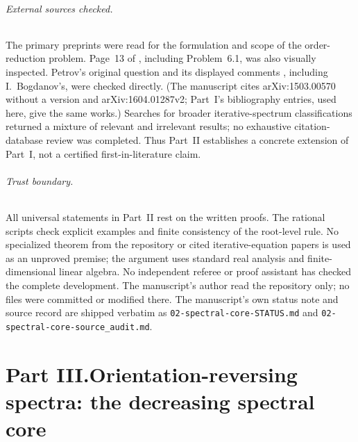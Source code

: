 \documentclass[11pt,letterpaper]{article}
\theoremstyle{definition}
\theoremstyle{remark}
\begin{document}
\paragraph{External sources checked.}
The primary preprints \cite{DM2016,D2016} were read for the formulation and
scope of the order-reduction problem. Page~13 of \cite{DM2016}, including
Problem~6.1, was also visually inspected. Petrov's original question and
its displayed comments \cite{Petrov2016}, including I.~Bogdanov's, were
checked directly. (The manuscript cites arXiv:1503.00570 without a version
and arXiv:1604.01287v2; Part~I's bibliography entries, used here, give the
same works.) Searches for broader iterative-spectrum classifications
returned a mixture of relevant and irrelevant results; no exhaustive
citation-database review was completed. Thus Part~II establishes a concrete
extension of Part~I, not a certified first-in-literature claim.

\paragraph{Trust boundary.}
All universal statements in Part~II rest on the written proofs.
The rational scripts check explicit examples and finite consistency of
the root-level rule. No specialized theorem from the repository or cited
iterative-equation papers is used as an unproved premise; the argument uses
standard real analysis and finite-dimensional linear algebra. No independent
referee or proof assistant has checked the complete development. The
manuscript's author read the repository only; no files were committed or
modified there. The manuscript's own status note and source record are
shipped verbatim as \nolinkurl{02-spectral-core-STATUS.md} and
\nolinkurl{02-spectral-core-source_audit.md}.


\clearpage
{}\part*{Part III.\quad Orientation-reversing spectra: the decreasing spectral core}
\end{document}
